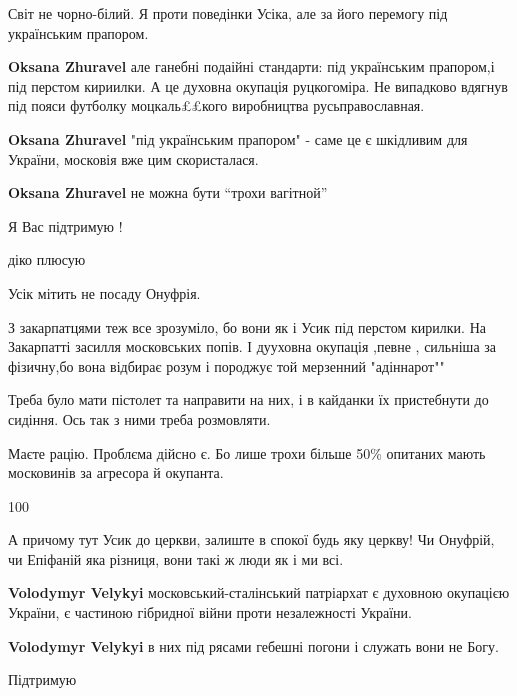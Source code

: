 \begin{itemize}
Світ не чорно-білий. Я проти поведінки Усіка, але за його перемогу під українським прапором.

\begin{itemize} %
\textbf{Oksana Zhuravel} але ганебні подаійні стандарти: під українським прапором,і під перстом кириилки. А це духовна окупація руцкогоміра. Не випадково вдягнув під пояси футболку моцкаль££кого виробництва русьправославная.

\textbf{Oksana Zhuravel} "під українським прапором" - саме це є шкідливим для України, московія вже цим скористалася.

\textbf{Oksana Zhuravel} не можна бути \enquote{трохи вагітной}
\end{itemize} %

Я Вас підтримую !

діко плюсую

Усік мітить не посаду Онуфрія.


З закарпатцями теж все зрозуміло, бо вони як і Усик під перстом кирилки. На
Закарпатті засилля московських попів. І дууховна окупація ,певне , сильніша за
фізичну,бо вона відбирає розум і породжує той мерзенний "адіннарот""



Треба було мати пістолет та направити на них, і в кайданки їх пристебнути до
сидіння. Ось так з ними треба розмовляти.

Маєте рацію. Проблєма дійсно є. Бо лише трохи більше 50\% опитаних мають московинів за агресора й окупанта.

100


А причому тут Усик до церкви, залиште в спокої будь яку церкву!
Чи Онуфрій, чи Епіфаній яка різниця, вони такі ж люди як і ми всі.

\begin{itemize} %
\textbf{Volodymyr Velykyi} московський-сталінський патріархат є духовною окупацією України, є частиною гібридної війни проти незалежності України.

\textbf{Volodymyr Velykyi} в них під рясами гебешні погони і служать вони не Богу.
\end{itemize} %

Підтримую


\end{itemize} %
